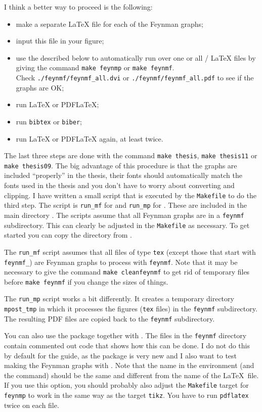 I think a better way to proceed is the following:
\begin{itemize}
\item make a separate \LaTeX{} file for each of the Feynman graphs;
\item input this file in your figure;
\item use the  described below to automatically run
  over one or all / \LaTeX{} files by giving the
  command \texttt{make feynmp} or \texttt{make feynmf}.\\
  Check
  \texttt{./feynmf/feynmf\_all.dvi} or
  \texttt{./feynmf/feynmf\_all.pdf} to see if the graphs are OK\@;
\item run \LaTeX{} or PDF\LaTeX; %
\item run \texttt{bibtex} or \texttt{biber};
\item run \LaTeX{} or PDF\LaTeX{} again, at least twice.
\end{itemize}
The last three steps are done with the command \texttt{make thesis},
\texttt{make thesis11} or
\texttt{make thesis09}.
The big advantage of this procedure is that the graphs are included
\enquote{properly} in the thesis, their fonts should automatically
match the fonts used in the thesis and you don't have to worry about
converting and clipping. I have written a small script that is
executed by the \texttt{Makefile} to do the third step.
The script is \texttt{run\_mf} for  and
\texttt{run\_mp} for . These are
included in the main directory .
The scripts assume that all Feynman graphs are in 
a \texttt{feynmf} subdirectory. This can clearly be
adjusted in the \texttt{Makefile} as necessary.
To get started you can copy the  directory from .

The \texttt{run\_mf} script assumes that all files of type
\texttt{tex} (except those that start with \texttt{feynmf\_}) are
Feynman graphs to process with \texttt{feynmf}. Note that it may be
necessary to give the command \texttt{make cleanfeynmf} to get rid of
temporary files before \texttt{make feynmf} if you change the sizes of
things.

The \texttt{run\_mp} script works a bit differently. It creates a
temporary directory \texttt{mpost\_tmp} in which it processes the
figures (\texttt{tex} files) in the \texttt{feynmf} subdirectory. The
resulting PDF files are copied back to the \texttt{feynmf}
subdirectory.

You can also use the package  together with
. The files in the \texttt{feynmf} directory contain
commented out code that shows how this can be done. I do not do this
by default for the guide, as the package is very new and I also want
to test making the Feynman graphs with . Note that
the name in the  environment (and the 
command) should be the same and different from the name of the \LaTeX\
file. If you use this option, you should probably also adjust the
\texttt{Makefile} target for \texttt{feynmp} to work in the same way
as the target \texttt{tikz}. You have to run \texttt{pdflatex} twice
on each file.


